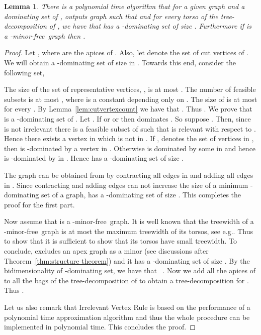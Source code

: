 \documentclass[11pt]{article}
\newtheorem{lemma}{Lemma}
\newcommand{\Hmf}{-minor-free}
\begin{document}
\begin{lemma}
\label{lem:sumreductioncondomset}
There is a polynomial time algorithm that for  a given graph  and a dominating set  of , outputs graph  such that  and for every torso  of the tree-decomposition  of , we have that  has a -dominating set of size . Furthermore if  is a \Hmf \, graph then . 
\end{lemma}
\begin{proof}
Let , where  are the apices of . Also, let  denote the set of cut vertices of . 
We will obtain a -dominating set of size  in . Towards this end, consider the following set, 

The size of the set of representative vertices, , is at most . The number of feasible subsets  is at most , where  is a constant depending only on . The size of  is at most  for every . By Lemma~\ref{lem:cutvertexcount} we have that . Thus  . We prove that  is a -dominating set of . Let . If  or  or  then  dominates . So suppose . Then, since  is not irrelevant there is a feasible subset  of  such that  is relevant with respect to . Hence there exists a vertex  in  which is not in . If ,  denotes the set of vertices in , 
 then  is -dominated by a vertex   in . Otherwise  is dominated by some  in  and hence  is -dominated by  in . Hence  has a -dominating set of size .

The graph  can be obtained from  by contracting all edges in  and adding all edges in . Since contracting and adding edges can not increase the size of a minimum -dominating set of a graph,  has a -dominating set of size .
This completes the proof for the first part.

Now assume that  is a \Hmf \, graph. It is well known  that the treewidth of a \Hmf \, graph is at most the maximum treewidth of its torsos, see e.g.\cite{DemaineFHT05sub}. Thus to show that  it is sufficient to show that its torsos have small treewidth.  
To conclude,  excludes an apex graph as a minor  (see discussions after Theorem~\ref{thm:structure theorem}) and it has a -dominating set of size . By the bidimensionality of -dominating set, we have that ~\cite{DemaineFHT05sub,FominGT09con}. Now we add all the apices of  to all the bags of the tree-decomposition  of  to obtain a tree-decomposition for .  Thus . 

Let us also remark that Irrelevant Vertex Rule is based on the performance of a polynomial time approximation algorithm and thus the whole procedure can be implemented in polynomial time. This concludes the proof. 
\end{proof}
\end{document}
